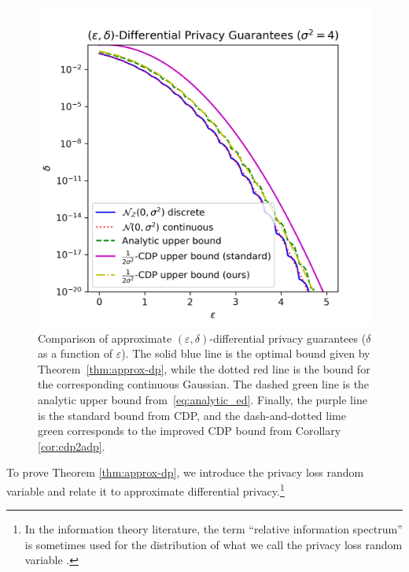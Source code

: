 \documentclass{jpc}
\newcommand{\eps}{\varepsilon}
\begin{document}
\begin{figure}[ht!]
\begin{minipage}{0.5\textwidth}
        \includegraphics[width=\textwidth]{dg_epsdelta2.png}
    \end{minipage}
    \caption{\label{fig:epsdelta} Comparison of approximate $(\eps,\delta)$-differential privacy guarantees ($\delta$ as a function of $\eps$). The solid blue line is the optimal bound given by Theorem~\ref{thm:approx-dp}, while the dotted red line is the bound for the corresponding continuous Gaussian. The dashed green line is the analytic upper bound from~\eqref{eq:analytic_ed}. Finally, the purple line is the standard bound from CDP, and the dash-and-dotted lime green corresponds to the improved CDP bound from Corollary \ref{cor:cdp2adp}.}\label{fig:my_label}
\end{figure}

To prove Theorem \ref{thm:approx-dp}, we introduce the privacy loss random variable \citep{DworkRV10,DworkR16,BunS16} and relate it to approximate differential privacy.\footnote{In the information theory literature, the term ``relative information spectrum'' is sometimes used for the distribution of what we call the privacy loss random variable \citep{SasonV16,Liu18}.}
\end{document}

